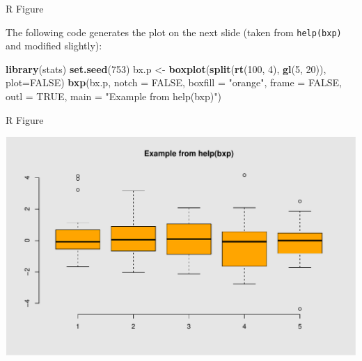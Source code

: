 \documentclass[14pt,ignorenonframetext,compress]{beamer}
\newenvironment{Shaded}{\begin{snugshade}}{\end{snugshade}}
\newcommand{\DataTypeTok}[1]{\textcolor[rgb]{0.13,0.29,0.53}{#1}}
\newcommand{\DecValTok}[1]{\textcolor[rgb]{0.00,0.00,0.81}{#1}}
\newcommand{\KeywordTok}[1]{\textcolor[rgb]{0.13,0.29,0.53}{\textbf{#1}}}
\newcommand{\NormalTok}[1]{#1}
\newcommand{\OtherTok}[1]{\textcolor[rgb]{0.56,0.35,0.01}{#1}}
\newcommand{\StringTok}[1]{\textcolor[rgb]{0.31,0.60,0.02}{#1}}
\renewenvironment{Shaded}{\color{black}\begin{snugshade}\color{black}}{\end{snugshade}}
\begin{document}
\begin{frame}[fragile]{R Figure}
\protect\hypertarget{r-figure}{}

The following code generates the plot on the next slide (taken from
\texttt{help(bxp)} and modified slightly):

\small

\begin{Shaded}
\begin{Highlighting}[]
\KeywordTok{library}\NormalTok{(stats)}
\KeywordTok{set.seed}\NormalTok{(}\DecValTok{753}\NormalTok{)}
\NormalTok{bx.p <-}\StringTok{ }\KeywordTok{boxplot}\NormalTok{(}\KeywordTok{split}\NormalTok{(}\KeywordTok{rt}\NormalTok{(}\DecValTok{100}\NormalTok{, }\DecValTok{4}\NormalTok{),}
                      \KeywordTok{gl}\NormalTok{(}\DecValTok{5}\NormalTok{, }\DecValTok{20}\NormalTok{)), }\DataTypeTok{plot=}\OtherTok{FALSE}\NormalTok{)}
\KeywordTok{bxp}\NormalTok{(bx.p, }\DataTypeTok{notch =} \OtherTok{FALSE}\NormalTok{, }\DataTypeTok{boxfill =} \StringTok{"orange"}\NormalTok{,}
    \DataTypeTok{frame =} \OtherTok{FALSE}\NormalTok{, }\DataTypeTok{outl =} \OtherTok{TRUE}\NormalTok{,}
    \DataTypeTok{main =} \StringTok{"Example from help(bxp)"}\NormalTok{)}
\end{Highlighting}
\end{Shaded}

\end{frame}

\begin{frame}{R Figure}
\protect\hypertarget{r-figure-1}{}

\includegraphics{beamer_template_monash_files/figure-beamer/pressureFig-1.pdf}

\end{frame}
\end{document}
